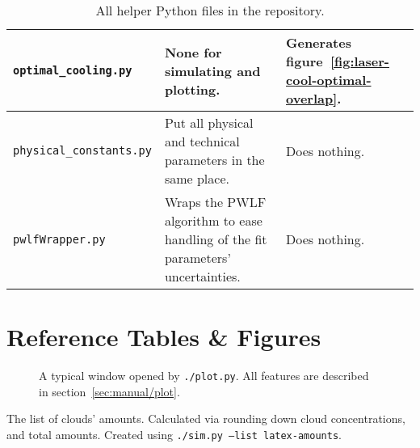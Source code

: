 \begin{sidewaystable}[h]
\begin{tabularx}{\textwidth}{l|X|X}
\hline
\texttt{optimal\_cooling.py}    & None for simulating and plotting.                                                                                                                      & Generates figure~\ref{fig:laser-cool-optimal-overlap}.                                                                                                                                                                                              \\
\hline
\texttt{physical\_constants.py} & Put all physical and technical parameters in the same place.                                                                                           & Does nothing.                                                                                                                                                                                                                                        \\
\hline
\texttt{pwlfWrapper.py}         & Wraps the PWLF algorithm to ease handling of the fit parameters' uncertainties.                                                                        & Does nothing.
\end{tabularx}
\caption{All helper Python files in the repository.}
\label{tbl:helper-scripts}
\end{sidewaystable}

\clearpage
\section{Reference Tables \& Figures}



\begin{sidewaysfigure}[h]
	\begin{center}
	\end{center}
	\caption{A typical window opened by \texttt{./plot.py}. All features are described in section~\ref{sec:manual/plot}.}
	\label{fig:software-plot-example}
\end{sidewaysfigure}

\begin{sidewaystable}[h]

\caption{The list of clouds' amounts. Calculated via rounding down cloud concentrations, and total amounts. Created using \texttt{./sim.py --list latex-amounts}.}
\label{tbl:sim-list-amounts}
\end{sidewaystable}
\restoregeometry

